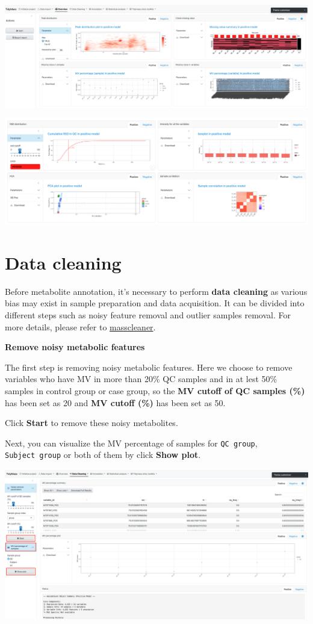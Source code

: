 \documentclass[
]{book}
\begin{document}
\includegraphics{figures/Overview1.png}

\includegraphics{figures/Overview2.png}

\section{Data cleaning}\label{data-cleaning}

Before metabolite annotation, it's necessary to perform \textbf{data cleaning} as various bias may exist in sample preparation and data acquisition. It can be divided into different steps such as noisy feature removal and outlier samples removal. For more details, please refer to \href{https://masscleaner.tidymass.org/}{masscleaner}.

\textbf{Remove noisy metabolic features}

The first step is removing noisy metabolic features. Here we choose to remove variables who have MV in more than 20\% QC samples and in at lest 50\% samples in control group or case group, so the \textbf{MV cutoff of QC samples (\%)} has been set as 20 and \textbf{MV cutoff (\%)} has been set as 50.

Click \textbf{Start} to remove these noisy metabolites.

Next, you can visualize the MV percentage of samples for \texttt{QC\ group}, \texttt{Subject\ group} or both of them by click \textbf{Show plot}.

\includegraphics{figures/noisy_metabolites.png}
\end{document}
